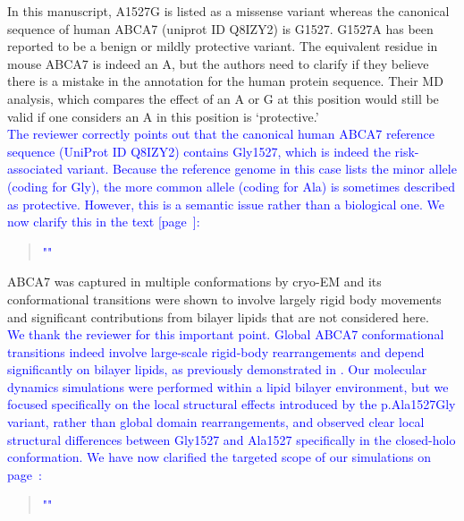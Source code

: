 In this manuscript, A1527G is listed as a missense variant whereas the canonical sequence of human ABCA7 (uniprot ID Q8IZY2) is G1527. G1527A has been reported to be a benign or mildly protective variant. The equivalent residue in mouse ABCA7 is indeed an A, but the authors need to clarify if they believe there is a mistake in the annotation for the human protein sequence. Their MD analysis, which compares the effect of an A or G at this position would still be valid if one considers an A in this position is ‘protective.’\\
\textcolor{blue}{The reviewer correctly points out that the canonical human ABCA7 reference sequence (UniProt ID Q8IZY2) contains Gly1527, which is indeed the risk-associated variant. Because the reference genome in this case lists the minor allele (coding for Gly), the more common allele (coding for Ala) is sometimes described as protective. However, this is a semantic issue rather than a biological one. We now clarify this in the text [page~\pageref{quoteL-label}]:}
\begin{quote}
	\textcolor{blue}{"}\quoteL\textcolor{blue}{"}\\
\end{quote}

ABCA7 was captured in multiple conformations by cryo-EM and its conformational transitions were shown to involve largely rigid body movements and significant contributions from bilayer lipids that are not considered here.\\
\textcolor{blue}{We thank the reviewer for this important point. Global ABCA7 conformational transitions indeed involve large-scale rigid-body rearrangements and depend significantly on bilayer lipids, as previously demonstrated in \cite{Le2023-on}. Our molecular dynamics simulations were performed within a lipid bilayer environment, but we focused specifically on the local structural effects introduced by the p.Ala1527Gly variant, rather than global domain rearrangements, and observed clear local structural differences between Gly1527 and Ala1527 specifically in the closed-holo conformation. We have now clarified the targeted scope of our simulations on page~\pageref{quoteP-label}:}
\begin{quote}
	\textcolor{blue}{"}\quoteP\textcolor{blue}{"}\\
\end{quote}

